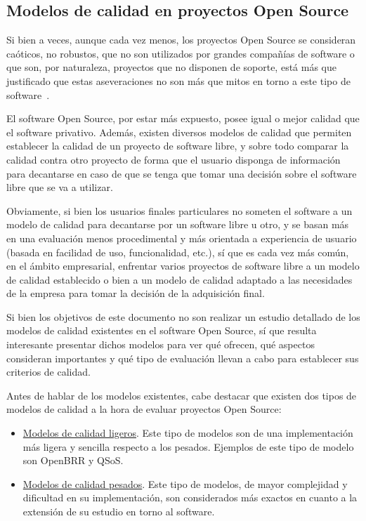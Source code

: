 \documentclass[11pt]{article}
\begin{document}
\subsection{Modelos de calidad en proyectos Open Source}

Si bien a veces, aunque cada vez menos, los proyectos Open Source se consideran caóticos, no robustos, que no son utilizados por grandes compañías de software o que son, por naturaleza, proyectos que no disponen de soporte, está más que justificado que estas aseveraciones no son más que mitos en torno a este tipo de software~\cite{oreilly:tenmythsaboutopensourcesoftware}.

El software Open Source, por estar más expuesto, posee igual o mejor calidad que el software privativo. Además, existen diversos modelos de calidad que permiten establecer la calidad de un proyecto de software libre, y sobre todo comparar la calidad contra otro proyecto de forma que el usuario disponga de información para decantarse en caso de que se tenga que tomar una decisión sobre el software libre que se va a utilizar.

Obviamente, si bien los usuarios finales particulares no someten el software a un modelo de calidad para decantarse por un software libre u otro, y se basan más en una evaluación menos procedimental y más orientada a experiencia de usuario (basada en facilidad de uso, funcionalidad, etc.), sí que es cada vez más común, en el ámbito empresarial, enfrentar varios proyectos de software libre a un modelo de calidad establecido o bien a un modelo de calidad adaptado a las necesidades de la empresa para tomar la decisión de la adquisición final.

Si bien los objetivos de este documento no son realizar un estudio detallado de los modelos de calidad existentes en el software Open Source, sí que resulta interesante presentar dichos modelos para ver qué ofrecen, qué aspectos consideran importantes y qué tipo de evaluación llevan a cabo para establecer sus criterios de calidad.

Antes de hablar de los modelos existentes, cabe destacar que existen dos tipos de modelos de calidad a la hora de evaluar proyectos Open Source:

\begin{itemize}
\item{\underline{Modelos de calidad ligeros}}. Este tipo de modelos son de una implementación más ligera y sencilla respecto a los pesados. Ejemplos de este tipo de modelo son OpenBRR y QSoS.
\item{\underline{Modelos de calidad pesados}}. Este tipo de modelos, de mayor complejidad y dificultad en su implementación, son considerados más exactos en cuanto a la extensión de su estudio en torno al software.
\end{itemize}
\end{document}
